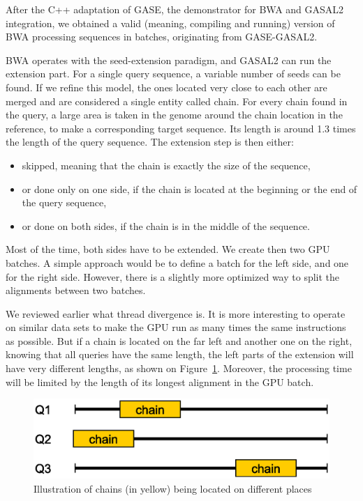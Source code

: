 After the C++ adaptation of GASE, the demonstrator for BWA and GASAL2 integration, we obtained a valid (meaning, compiling and running) version of BWA processing sequences in batches, originating from GASE-GASAL2.

BWA operates with the seed-extension paradigm, and GASAL2 can run the extension part. For a single query sequence, a variable number of seeds can be found. If we refine this model, the ones located very close to each other are merged and are considered a single entity called chain. For every chain found in the query, a large area is taken in the genome around the chain location in the reference, to make a corresponding target sequence. Its length is around 1.3 times the length of the query sequence. The extension step is then either:

\begin{itemize}
	\item skipped, meaning that the chain is exactly the size of the sequence,
	\item or done only on one side, if the chain is located at the beginning or the end of the query sequence,
	\item or done on both sides, if the chain is in the middle of the sequence.
\end{itemize}

Most of the time, both sides have to be extended. We create then two GPU batches. A simple approach would be to define a batch for the left side, and one for the right side. However, there is a slightly more optimized way to split the alignments between two batches.

We reviewed earlier what thread divergence is. It is more interesting to operate on similar data sets to make the GPU run as many times the same instructions as possible. But if a chain is located on the far left and another one on the right, knowing that all queries have the same length, the left parts of the extension will have very different lengths, as shown on Figure~\ref{fig:seds-different-chains}. Moreover, the processing time will be limited by the length of its longest alignment in the GPU batch.
\begin{figure}[h!]
	\centering
	\includegraphics[width=0.7\linewidth]{seds-different-chains}
	\caption{Illustration of chains (in yellow) being located on different places}
	\label{fig:seds-different-chains}
\end{figure}

